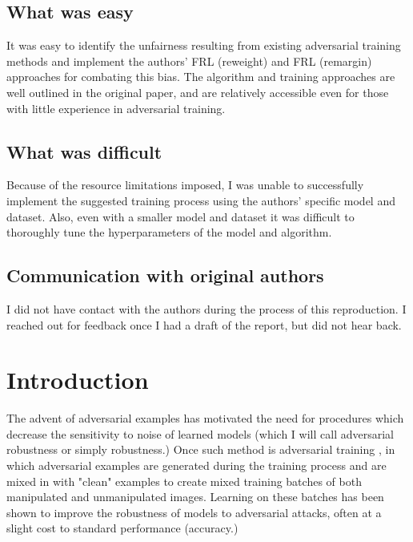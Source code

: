 \subsection*{What was easy}

It was easy to identify the unfairness resulting from existing adversarial training methods and implement the authors' FRL (reweight) and FRL (remargin) approaches for combating this bias. The algorithm and training approaches are well outlined in the original paper, and are relatively accessible even for those with little experience in adversarial training. 

\subsection*{What was difficult}

Because of the resource limitations imposed, I was unable to successfully implement the suggested training process using the authors' specific model and dataset. Also, even with a smaller model and dataset it was difficult to thoroughly tune the hyperparameters of the model and algorithm. 

\subsection*{Communication with original authors}

I did not have contact with the authors during the process of this reproduction. I reached out for feedback once I had a draft of the report, but did not hear back. 


\newpage

\section{Introduction}

The advent of adversarial examples \cite{https://doi.org/10.48550/arxiv.1412.6572}\cite{https://doi.org/10.48550/arxiv.1312.6199} has motivated the need for procedures which decrease the sensitivity to noise of learned models (which I will call adversarial robustness or simply robustness.) Once such method is adversarial training \cite{https://doi.org/10.48550/arxiv.1611.01236}\cite{https://doi.org/10.48550/arxiv.1706.06083}, in which adversarial examples are generated during the training process and are mixed in with "clean" examples to create mixed training batches of both manipulated and unmanipulated images. Learning on these batches has been shown to improve the robustness of models to adversarial attacks, often at a slight cost to standard performance (accuracy.) 

